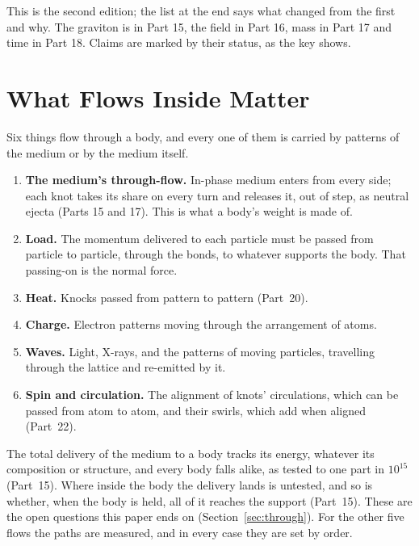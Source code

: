 \documentclass[11pt,a4paper]{article}
\begin{document}
This is the second edition; the list at the end says what changed from the first and why. The graviton is in Part 15, the field in Part 16, mass in Part 17 and time in Part 18. Claims are marked by their status, as the key shows.

\statuskey

\section{What Flows Inside Matter}
\label{sec:inventory}

\begin{hypbar}
Six things flow through a body, and every one of them is carried by patterns of the medium or by the medium itself.
\begin{enumerate}
\item \textbf{The medium's through-flow.} In-phase medium enters from every side; each knot takes its share on every turn and releases it, out of step, as neutral ejecta (Parts 15 and 17). This is what a body's weight is made of.
\item \textbf{Load.} The momentum delivered to each particle must be passed from particle to particle, through the bonds, to whatever supports the body. That passing-on is the normal force.
\item \textbf{Heat.} Knocks passed from pattern to pattern (Part~20).
\item \textbf{Charge.} Electron patterns moving through the arrangement of atoms.
\item \textbf{Waves.} Light, X-rays, and the patterns of moving particles, travelling through the lattice and re-emitted by it.
\item \textbf{Spin and circulation.} The alignment of knots' circulations, which can be passed from atom to atom, and their swirls, which add when aligned (Part~22).\footnotemark{}
\end{enumerate}
\end{hypbar}

 The total delivery of the medium to a body tracks its energy, whatever its composition or structure, and every body falls alike, as tested to one part in $10^{15}$ (Part~15). Where inside the body the delivery lands is untested, and so is whether, when the body is held, all of it reaches the support (Part~15). These are the open questions this paper ends on (Section~\ref{sec:through}). For the other five flows the paths are measured, and in every case they are set by order.
\end{document}
